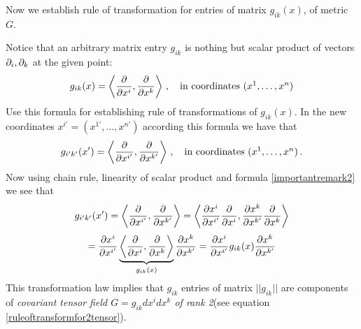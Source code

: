 \documentclass[12pt]{article}
\theoremstyle{theorem}
\numberwithin{equation}{section}
\begin{document}





Now we establish rule of 
transformation for entries of matrix $g_{ik}(x)$, of metric $G$.


  Notice that an arbitrary matrix entry $g_{ik}$ is nothing but scalar product
of vectors $\partial_i,\partial_k$ at the given point:  
   \begin{equation}\label{importantremark2}
 g_{ik}(x)=\left\langle{{\partial\over \partial x^i},{\partial\over \partial x^k}}\right\rangle\,,
\quad \hbox{in coordinates $(x^1,\dots,x^n)$}
     \end{equation}
Use this formula for establishing rule of transformations of $g_{ik}(x)$.
  In the new coordinates $x^{i'}=(x^{1'},\dots,x^{n'})$
according this formula we have that
   \begin{equation*}\label{innewcoordinates}
 g_{i'k'}(x')=\left\langle{{\partial\over \partial x^{i'}},{\partial\over \partial x^{k'}}}
                \right\rangle\,,
\quad \hbox{in coordinates $(x^1,\dots,x^n)$}\,.
      \end{equation*}
Now using chain rule, linearity of scalar product and formula
 \eqref{importantremark2} we see that
               $$ 
g_{i'k'}(x')=\left\langle
        {{\partial\over \partial x^{i'}},{\partial\over \partial x^{k'}}}
          \right\rangle
 =\left\langle
     {{\partial x^i\over \partial x^{i'}}{\partial\over \partial x^{i}},
     {\partial x^k\over\partial x^{k'}}{\partial\over \partial x^{k}}}
   \right\rangle
         $$
       \begin{equation}\label{transformofmetric}
 ={\partial x^i\over \partial x^{i'}}
        \underbrace
             {
          \left\langle
     {{\partial\over \partial x^{i}},
     {\partial\over \partial x^{k}}}
   \right\rangle
           }_{g_{ik}(x)}
          {\partial x^k\over\partial x^{k'}}=
   {\partial x^i\over \partial x^{i'}}
          g_{ik}(x)          
{\partial x^k\over\partial x^{k'}}
         \end{equation}
This transformation law implies  that $g_{ik}$ entries
of matrix $||g_{ik}||$ are components of {\it covariant
tensor field
 $G=g_{ik}dx^idx^k$ of rank 2}(see equation 
\eqref{ruleoftransformfor2tensor}).
\end{document}
